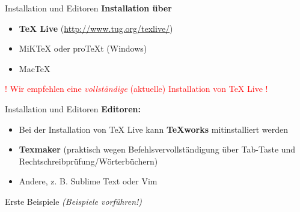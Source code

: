 \documentclass[11pt]{beamer}
\begin{document}
\begin{frame}{Installation und Editoren}
\textbf{Installation über}

\smallskip
\begin{itemize}
\item \textbf{TeX Live} (\url{http://www.tug.org/texlive/})\\
\item MiKTeX oder proTeXt (Windows)
\item MacTeX
\end{itemize}

\smallskip\noindent
\textcolor{red}{! Wir empfehlen eine \emph{vollständige} (aktuelle) Installation von TeX Live !}
\end{frame}

\begin{frame}{Installation und Editoren}
\textbf{Editoren:}

\smallskip
\begin{itemize}
\item Bei der Installation von TeX Live kann \textbf{TeXworks} mitinstalliert werden
\item \textbf{Texmaker} (praktisch wegen Befehlsvervollständigung über Tab-Taste und Rechtschreibprüfung/Wörterbüchern)
\item Andere, z. B. Sublime Text oder Vim
\end{itemize}
\end{frame}

\begin{frame}{Erste Beispiele}
\emph{(Beispiele vorführen!)}
\end{frame}
\end{document}
